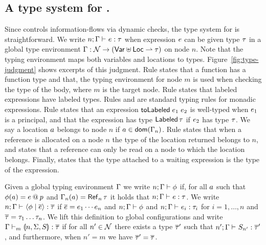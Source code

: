 \subsection{A type system for \lang.}
Since \lang{} controls information-flows via dynamic checks, the type system for \lang{} is straightforward. We write $\hastype{n; \tenv}{\expr}{\type}$ when expression $e$ can be given type $\tau$ in a global type environment $\Gamma: \mathcal{N} \to (\mathsf{Var} \uplus \mathsf{Loc} \rightharpoonup \tau)$ on node $n$. Note that the typing environment maps both variables and locations to types. Figure~\ref{fig:type-judgment} shows excerpts of this judgment.
Rule  states that a function has a function type and that, the typing environment for node $m$ is used when checking the type of the body, where $m$ is the target node. Rule  states that labeled expressions have labeled types. Rules  and  are standard typing rules for monadic expressions. Rule  states that an expression $\mathsf{toLabeled}\;e_1\;e_2$ is well-typed when $e_1$ is a principal, and that the expression has type $\mathsf{Labeled}\,\tau$ if $e_2$ has type $\tau$.
We say a location $a$ belongs to node $n$ if $a \in \mathsf{dom}(\Gamma_n)$. Rule  states that when a reference is allocated on a node $n$ the type of the location returned belongs to $n$, and  states that a reference can only be read on a node to which the location belongs. Finally,  states that the type attached to a waiting expression is the type of the expression.

Given a global typing environment $\Gamma$ we write $n; \Gamma \vdash \phi$ if, for all $a$ such that $\phi(a) = e \mathbin{@} p$ and $\tenv_n(\addr) = \reftype[n]{\type}$ it holds that $\hastype{n; \tenv}{\expr}{\type}$. We write $\hastype{n; \tenv}{\config{\store}{\overline{\expr}}}{\overline{\type}}$ if $\overline{e} = e_1 \cdots e_n$ and $n; \Gamma \vdash \phi$ and $\hastype{n; \tenv}{\expr_i}{\type_i}$ for $i = 1, \dots, n$ and $\overline{\tau} = \tau_1 \dots \tau_n$. We lift this definition to global configurations and write $\hastype[m]{\tenv}{\gconfig{n}{\env}{S}}{\overline{\type}}$ if for all $n' \in \mathcal{N}$ there exists a type $\overline{\tau}'$ such that $\hastype{n'; \tenv}{S_{n'}}{\overline{\type}'}$, and furthermore, when $n' = m$ we have $\overline{\tau}' = \overline{\tau}$.

